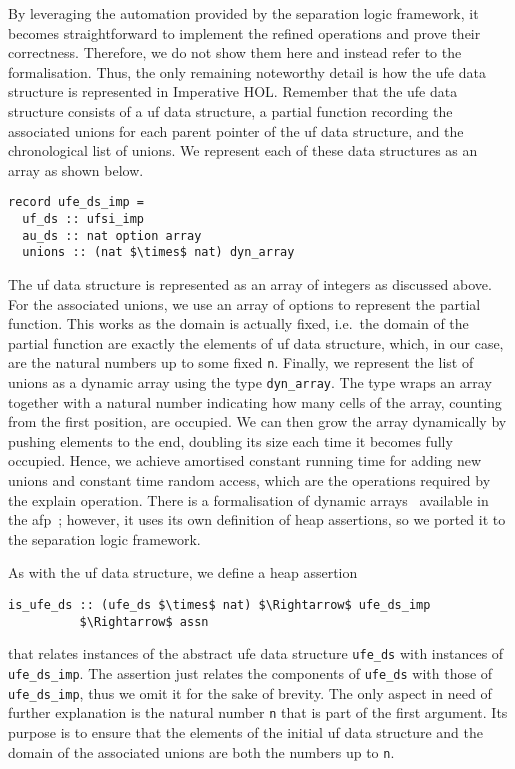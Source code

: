 \documentclass[
  sigplan,
  10pt,
  anonymous,
  review,
  ]{acmart}
\newcommand{\opexplain}{explain}
\begin{document}
By leveraging the automation provided by the separation logic framework,
it becomes straightforward to implement the refined operations and prove their correctness.
Therefore, we do not show them here and instead refer to the formalisation.
Thus, the only remaining noteworthy detail is how the \acrshort{ufe} data structure is represented in Imperative HOL.
Remember that the \acrshort{ufe} data structure consists of a \acrshort{uf} data structure, a partial function recording the associated unions for each parent pointer of the \acrshort{uf} data structure, and the chronological list of unions.
We represent each of these data structures as an array as shown below.
\begin{lstlisting}
record ufe_ds_imp =
  uf_ds :: ufsi_imp
  au_ds :: nat option array
  unions :: (nat $\times$ nat) dyn_array
\end{lstlisting}
The \acrshort{uf} data structure is represented as an array of integers as discussed above.
For the associated unions, we use an array of options to represent the partial function.
This works as the domain is actually fixed, i.e.\ the domain of the partial function are exactly the elements of \acrshort{uf} data structure, which, in our case, are the natural numbers up to some fixed \lstinline|n|.
Finally, we represent the list of unions as a dynamic array using the type \lstinline|dyn_array|.
The type wraps an array together with a natural number indicating how many cells of the array, counting from the first position, are occupied.
We can then grow the array dynamically by pushing elements to the end, doubling its size each time it becomes fully occupied.
Hence, we achieve amortised constant running time for adding new unions and constant time random access, which are the operations required by the \opexplain{} operation. 
There is a formalisation of dynamic arrays~\cite{imperative_hol_auto2} available in the \acrshort{afp}~\cite{imperative_hol_auto2}; 
however, it uses its own definition of heap assertions, so we ported it to the separation logic framework. 

As with the \acrshort{uf} data structure, we define a heap assertion
\begin{lstlisting}
is_ufe_ds :: (ufe_ds $\times$ nat) $\Rightarrow$ ufe_ds_imp
          $\Rightarrow$ assn
\end{lstlisting}
that relates instances of the abstract \acrshort{ufe} data structure \lstinline|ufe_ds| with instances of \lstinline|ufe_ds_imp|.
The assertion just relates the components of \lstinline|ufe_ds| with those of \lstinline|ufe_ds_imp|, thus we omit it for the sake of brevity.
The only aspect in need of further explanation is the natural number \lstinline|n| that is part of the first argument.
Its purpose is to ensure that the elements of the initial \acrshort{uf} data structure and the domain of the associated unions are both the numbers up to \lstinline|n|.
\end{document}
